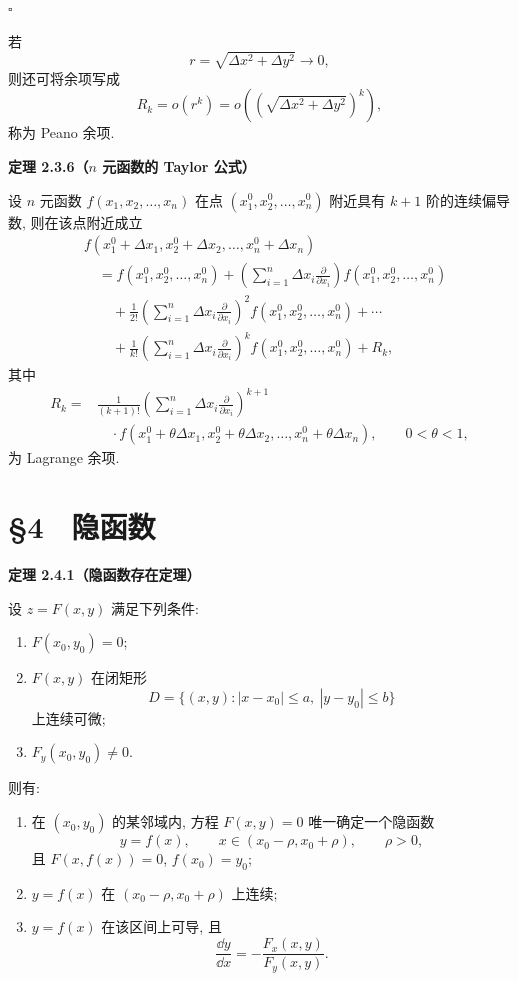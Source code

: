 $\square$



若
\[
r=\sqrt{\Delta x^2+\Delta y^2}\to0,
\]
则还可将余项写成
\[
R_k=o(r^k)
=o\left(\left(\sqrt{\Delta x^2+\Delta y^2}\right)^k\right),
\]
称为 Peano 余项.



\textbf{定理 2.3.6（$n$ 元函数的 Taylor 公式）}


	设 $n$ 元函数 $f(x_1,x_2,\ldots,x_n)$ 在点
	$(x_1^0,x_2^0,\ldots,x_n^0)$ 附近具有 $k+1$ 阶的连续偏导数,
	则在该点附近成立
	\[
	\begin{aligned}
	&f(x_1^0+\Delta x_1,x_2^0+\Delta x_2,\ldots,x_n^0+\Delta x_n)\\
	&\quad=
	f(x_1^0,x_2^0,\ldots,x_n^0)
	+\left(
	\sum_{i=1}^n\Delta x_i\frac{\partial}{\partial x_i}
	\right)f(x_1^0,x_2^0,\ldots,x_n^0)\\
	&\qquad+
	\frac{1}{2!}
	\left(
	\sum_{i=1}^n\Delta x_i\frac{\partial}{\partial x_i}
	\right)^2 f(x_1^0,x_2^0,\ldots,x_n^0)
	+\cdots\\
	&\qquad+
	\frac{1}{k!}
	\left(
	\sum_{i=1}^n\Delta x_i\frac{\partial}{\partial x_i}
	\right)^k f(x_1^0,x_2^0,\ldots,x_n^0)
	+R_k,
	\end{aligned}
	\]
	其中
	\[
	\begin{aligned}
	R_k
	={}&
	\frac{1}{(k+1)!}
	\left(
	\sum_{i=1}^n\Delta x_i\frac{\partial}{\partial x_i}
	\right)^{k+1}\\
	&\quad\cdot
	f(x_1^0+\theta\Delta x_1,x_2^0+\theta\Delta x_2,
	\ldots,x_n^0+\theta\Delta x_n),
	\qquad 0<\theta<1,
	\end{aligned}
	\]
	为 Lagrange 余项.










\section*{§4　隐函数}



\textbf{定理 2.4.1（隐函数存在定理）}


	设 $z=F(x,y)$ 满足下列条件:
	\begin{enumerate}
		\item $F(x_0,y_0)=0$;
		\item $F(x,y)$ 在闭矩形
		\[
		D=\{(x,y):|x-x_0|\le a,\ |y-y_0|\le b\}
		\]
		上连续可微;
		\item $F_y(x_0,y_0)\ne0$.
	\end{enumerate}
	则有:
	\begin{enumerate}
		\item[(i)] 在 $(x_0,y_0)$ 的某邻域内, 方程 $F(x,y)=0$
		唯一确定一个隐函数
		\[
		y=f(x),\qquad x\in(x_0-\rho,x_0+\rho),\qquad \rho>0,
		\]
		且 $F(x,f(x))=0$, $f(x_0)=y_0$;
		\item[(ii)] $y=f(x)$ 在 $(x_0-\rho,x_0+\rho)$ 上连续;
		\item[(iii)] $y=f(x)$ 在该区间上可导, 且
		\[
		\frac{\dd y}{\dd x}
		=
		-\frac{F_x(x,y)}{F_y(x,y)}.
		\]
	\end{enumerate}






